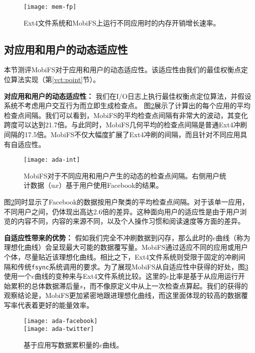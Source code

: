 \begin{figure}[!ht]
  \centering
  \texttt{[image: mem-fp]}
  \caption{Ext4文件系统和MobiFS上运行不同应用时的内存开销增长速率。}
  \label{fig:mem-fp}
\end{figure}

\subsection{对应用和用户的动态适应性} \label{vct:eval-ada}

本节测评MobiFS对于应用和用户的动态适应性。该适应性由我们的最佳权衡点定位算法实现（第\ref{vct:point}节）。

\noindent\textbf{对应用和用户的动态适应性：}
我们在I/O日志上执行最佳权衡点定位算法，并假设系统不考虑用户交互行为而立即生成检查点。
图\ref{fig:ada-int}展示了计算出的每个应用的平均检查点间隔。我们可以看到，MobiFS的平均检查点间隔有非常大的波动，其变化跨度可以达到21.7倍。与此同时，MobiFS几何平均的检查点间隔是普通Ext4冲刷间隔的17.5倍。MobiFS不仅大幅度扩展了Ext4冲刷的间隔，而且针对不同应用具有自适应性。

\begin{figure}[!ht]
  \centering
  \texttt{[image: ada-int]}
  \caption{MobiFS对于不同应用和用户产生的动态的检查点间隔。右侧用户统计数据（u$x$）基于用户使用Facebook的结果。}
  \label{fig:ada-int}
\end{figure}

图\ref{fig:ada-int}同时显示了Facebook的数据按用户聚类的平均检查点间隔。对于该单一应用，不同用户之间，仍体现出高达2.6倍的差异。这种面向用户的适应性是由于用户浏览的内容不同，内容的来源不同，以及个人操作习惯和阅读速度等方面的差异。

\noindent\textbf{自适应性带来的优势：}
假如我们完全不冲刷数据到闪存，那么此时的$e$曲线（称为理想化曲线）会呈现最大可能的数据覆写量。MobiFS通过适应不同的应用或用户个体，尽量贴近该理想化曲线。相比之下，Ext4文件系统则受限于固定的冲刷间隔和传统\texttt{fsync}系统调用的要求。为了展现MobiFS从自适应性中获得的好处，图\ref{fig:spa-ada}使用一个$e$曲线的变种来与Ext4文件系统比较。这里的$e$比率是基于从应用运行开始累积的总体数据滞后量$s$，而不像原定义中从上一次检查点算起。我们的获得的观察结论是，MobiFS更加紧密地跟进理想化曲线，而这里面体现的较高的数据覆写率代表着更好的能量效率。

\begin{figure}[!ht]
\centering
\texttt{[image: ada-facebook]}\\
\texttt{[image: ada-twitter]}\\
\caption{基于应用写数据累积量的$e$曲线。}
\label{fig:spa-ada}
\end{figure}

